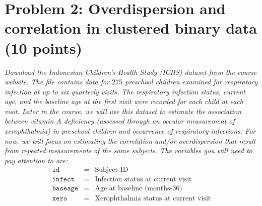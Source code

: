 \documentclass[11pt, letterpaper]{article}
\newcommand{\beas}{\begin{eqnarray*}}
\newcommand{\eeas}{\end{eqnarray*}}
\begin{document}
\section*{Problem 2: Overdispersion and correlation in clustered binary data (10 points)}
{\em Download the Indonesian Children's Health Study (ICHS) dataset from the course website.  
The file contains data for
$275$ preschool children examined for respiratory infection at up to six quarterly visits.  
The respiratory infection status, current age, and
the baseline age at the first visit were recorded for each child at each visit.
Later in the course, we will use this dataset to estimate
the association between vitamin A deficiency (assessed through an occular measurement of xerophthalmia)
in preschool children and occurrence of respiratory infections. 
For now, we will focus on estimating
the correlation and/or overdispersion that result from repeated measurements of the same subjects.
The variables you will need to pay attention to are:
\beas
\texttt{id}&=&\text{Subject ID}\\
\texttt{infect}&=&\text{Infection status at current visit}\\
\texttt{baseage}&=&\text{Age at baseline (months-36)}\\
\texttt{xero}&=&\text{Xerophthalmia status at current visit}
\eeas}
\end{document}
